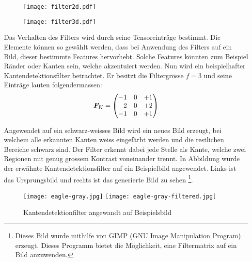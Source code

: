 \begin{figure}[h!]
  \centering
  \begin{minipage}{0.4\textwidth}
    \centering
    \texttt{[image: filter2d.pdf]}
    \label{fig:filter2d}
  \end{minipage}\hspace{1cm}%
  \begin{minipage}{0.5\textwidth}
    \centering
    \texttt{[image: filter3d.pdf]}
    \label{fig:filter3d}
  \end{minipage}
\end{figure}
\para{}
Das Verhalten des Filters wird durch seine Tensoreinträge bestimmt.
Die Elemente können so gewählt werden, dass bei Anwendung des Filters auf
ein Bild, dieser bestimmte Features hervorhebt. Solche Features
könnten zum Beispiel Ränder oder Kanten sein, welche akzentuiert werden.
\para{}
Nun wird ein beispielhafter Kantendetektionsfilter betrachtet. Er besitzt die
Filtergrösse $f=3$ und seine Einträge lauten folgendermassen:
\begin{equation*}
  \bm{F}_K =
  \begin{pmatrix}
    -1 & 0 & +1 \\
    -2 & 0 & +2 \\
    -1 & 0 & +1 \\
  \end{pmatrix}
\end{equation*}

Angewendet auf ein schwarz-weisses Bild wird ein neues Bild erzeugt, bei welchem alle erkannten
Kanten weiss eingefärbt werden und die restlichen Bereiche schwarz sind.
Der Filter erkennt dabei jede Stelle als Kante, welche zwei Regionen mit
genug grossem Kontrast voneinander trennt.
In Abbildung  wurde der erwähnte Kantendetektionsfilter auf ein
Beispielbild angewendet. Links ist das Ursprungsbild und rechts ist das
generierte Bild zu sehen%
\footnote{
  Dieses Bild wurde mithilfe von GIMP (GNU Image Manipulation Program) erzeugt. Dieses
  Programm bietet die Möglichkeit, eine Filtermatrix auf ein Bild anzuwenden.
}.

\begin{figure}[h!]
  \centering
  \texttt{[image: eagle-gray.jpg]}
  \texttt{[image: eagle-gray-filtered.jpg]}
  \caption{Kantendetektionfilter angewandt auf Beispielsbild \cite{res:eagle_image}}
  \label{fig:edge_filter}
\end{figure}


